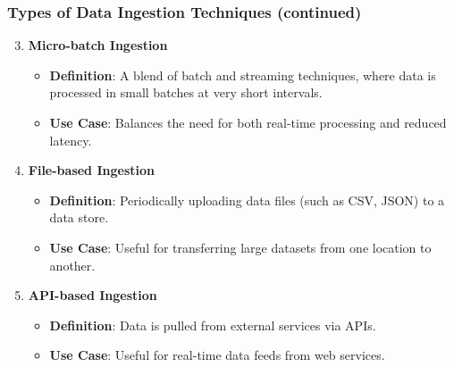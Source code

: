 \documentclass{beamer}
\begin{document}
\begin{frame}[fragile]
    \frametitle{Types of Data Ingestion Techniques (continued)}
    \begin{enumerate}
        \setcounter{enumi}{2} %
        \item \textbf{Micro-batch Ingestion}
            \begin{itemize}
                \item \textbf{Definition}: A blend of batch and streaming techniques, where data is processed in small batches at very short intervals.
                \item \textbf{Use Case}: Balances the need for both real-time processing and reduced latency.
            \end{itemize}

        \item \textbf{File-based Ingestion}
            \begin{itemize}
                \item \textbf{Definition}: Periodically uploading data files (such as CSV, JSON) to a data store.
                \item \textbf{Use Case}: Useful for transferring large datasets from one location to another.
            \end{itemize}

        \item \textbf{API-based Ingestion}
            \begin{itemize}
                \item \textbf{Definition}: Data is pulled from external services via APIs.
                \item \textbf{Use Case}: Useful for real-time data feeds from web services.
            \end{itemize}
    \end{enumerate}
\end{frame}
\end{document}
